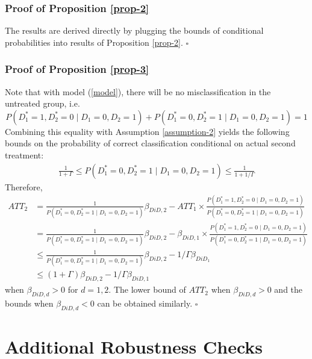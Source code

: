 \documentclass[a4paper,12pt]{article}
\begin{document}
\subsubsection{Proof of Proposition \ref{prop-2}}

The results are derived directly by plugging the bounds of conditional probabilities into results of Proposition \ref{prop-2}. $\square$

\subsubsection{Proof of Proposition \ref{prop-3}}

Note that with model (\ref{model}), there will be no misclassification in the untreated group, i.e.
\begin{equation*}
    P(D_1^\ast=1, D_2^\ast = 0 \mid D_1=0,D_2=1)+P(D_1^\ast=0, D_2^\ast = 1 \mid D_1=0,D_2=1)=1
\end{equation*}
Combining this equality with Assumption \ref{assumption-2} yields the following bounds on the probability of correct classification conditional on actual second treatment:
\begin{align}\label{proof-prop-2-bound}
    \frac{1}{1+\Gamma} \leq P(D_1^\ast=0,D_2^\ast=1 \mid D_1=0,D_2=1) \leq \frac{1}{1+1/\Gamma}
\end{align}
Therefore,
\begin{align*}
    ATT_2 &= \frac{1}{P(D_1^\ast=0,D_2^\ast=1 \mid D_1=0,D_2=1)}\beta_{DiD,2}-ATT_1 \times\frac{P(D_1^\ast=1,D_2^\ast=0 \mid D_1=0,D_2=1)}{P(D_1^\ast=0,D_2^\ast=1 \mid D_1=0,D_2=1)}\\
    &= \frac{1}{P(D_1^\ast=0,D_2^\ast=1 \mid D_1=0,D_2=1)}\beta_{DiD,2}-\beta_{DiD,1} \times\frac{P(D_1^\ast=1,D_2^\ast=0 \mid D_1=0,D_2=1)}{P(D_1^\ast=0,D_2^\ast=1 \mid D_1=0,D_2=1)}\\
    &\leq \frac{1}{P(D_1^\ast=0,D_2^\ast=1 \mid D_1=0,D_2=1)}\beta_{DiD,2} - 1/\Gamma\beta_{DiD_1}\\
    &\leq (1+\Gamma)\beta_{DiD,2} - 1/\Gamma\beta_{DiD,1}
\end{align*}
when $\beta_{DiD,d} >0$ for $d=1,2$. The lower bound of $ATT_2$ when $\beta_{DiD,d} > 0$ and the bounds when $\beta_{DiD,d} < 0$ can be obtained similarly. $\square$


\clearpage
\newpage

\section{Additional Robustness Checks}\label{appendix-robustness}
\end{document}
